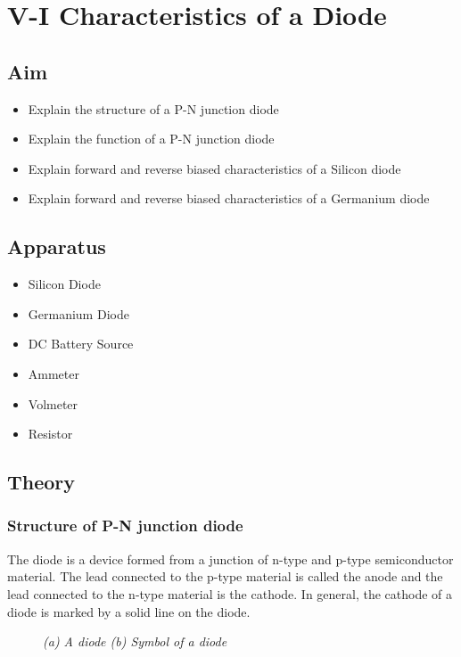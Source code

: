 \chapter{V-I Characteristics of a Diode}
	\section{Aim}
		\begin{itemize}
			\tightlist
			\item Explain the structure of a P-N junction diode
			\item Explain the function of a P-N junction diode
			\item Explain forward and reverse biased characteristics of a Silicon diode
			\item Explain forward and reverse biased characteristics of a Germanium diode
		\end{itemize}
	
	\section{Apparatus}
		\begin{itemize}
			\tightlist
			\item Silicon Diode
			\item Germanium Diode
			\item DC Battery Source
			\item Ammeter
			\item Volmeter
			\item Resistor
		\end{itemize}
	
	\section{Theory}
		\subsection{Structure of P-N junction diode}
			The diode is a device formed from a junction of n-type and p-type semiconductor material. The lead connected to the p-type material is called the anode and the lead connected to the n-type material is the cathode. In general, the cathode of a diode is marked by a solid line on the diode.
			\begin{figure}[ht]
				\centering 
				\hfill
				\caption{\textit{(a) A diode (b) Symbol of a diode}}
			\end{figure}
		
